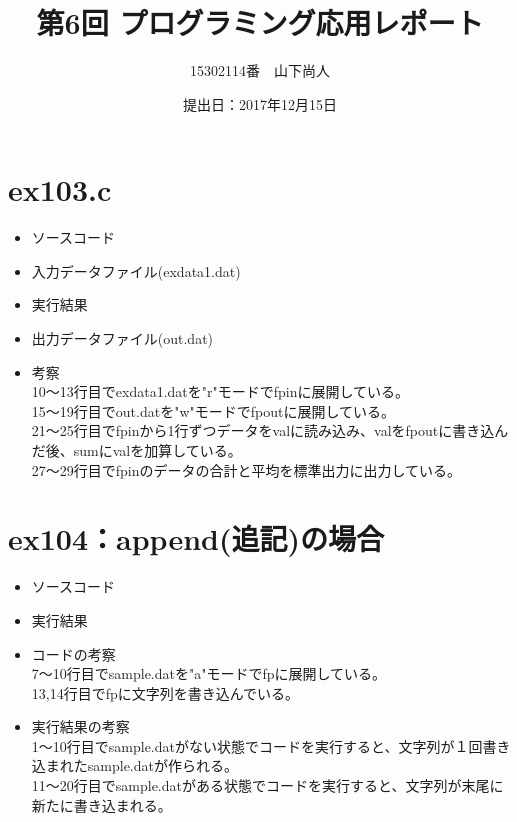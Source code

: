 \documentclass[a4paper]{jsarticle}
\title{第6回 プログラミング応用レポート}
\author{15302114番　山下尚人}
\date{提出日：2017年12月15日}
\begin{document}
\maketitle%

\section{ex103.c}
	\begin{itemize}
	\item ソースコード
		 
		\mbox{}\newline
	\item 入力データファイル(exdata1.dat)
		 
		\mbox{}\newline
	\item 実行結果
		 
		\mbox{}\newline
	\item 出力データファイル(out.dat)
		 
		\mbox{}\newline
	\item 考察\mbox{}\\
		10〜13行目でexdata1.datを"r"モードでfpinに展開している。\\
		15〜19行目でout.datを"w"モードでfpoutに展開している。\\
		21〜25行目でfpinから1行ずつデータをvalに読み込み、valをfpoutに書き込んだ後、sumにvalを加算している。\\
		27〜29行目でfpinのデータの合計と平均を標準出力に出力している。
	\end{itemize}

\section{ex104：append(追記)の場合}
	\begin{itemize}
	\item ソースコード
		 
		\mbox{}\newline
	\item 実行結果
		 
		\mbox{}\newline
	\item コードの考察\mbox{}\\
		7〜10行目でsample.datを"a"モードでfpに展開している。\\
		13,14行目でfpに文字列を書き込んでいる。
	\item 実行結果の考察\mbox{}\\
		1〜10行目でsample.datがない状態でコードを実行すると、文字列が１回書き込まれたsample.datが作られる。\\
		11〜20行目でsample.datがある状態でコードを実行すると、文字列が末尾に新たに書き込まれる。
	\end{itemize}
\end{document}
